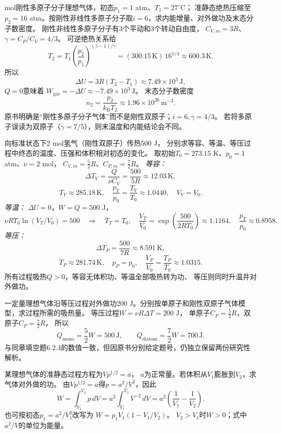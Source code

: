  mol刚性多原子分子理想气体，初态$p_1=1$ atm、$T_1=27^\circ\mathrm C$；
准静态绝热压缩至$p_2=16$ atm。按刚性非线性多原子分子取$i=6$，求内能增量、对外做功及末态分子数密度。
\workings
刚性非线性多原子分子有3个平动和3个转动自由度，
$C_{V,m}=3R$、$\gamma=C_P/C_V=4/3$。
可逆绝热关系给
\[
T_2=T_1\left(\frac{p_2}{p_1}\right)^{(\gamma-1)/\gamma}
=(300.15\,\mathrm K)\,16^{1/4}
\approx600.3\,\mathrm K.
\]
所以
\[
\boxed{\Delta U=3R(T_2-T_1)\approx7.49\times10^3\,\mathrm J},
\]
$Q=0$意味着
$\boxed{W_{\mathrm{gas}}=-\Delta U\approx-7.49\times10^3\,\mathrm J}$。
末态分子数密度
\[
\boxed{n_2=\frac{p_2}{k_{\mathrm B}T_2}
\approx1.96\times10^{26}\,\mathrm{m^{-3}}}.
\]
\crosscheck 原书明确是“刚性多原子分子气体”而不是刚性双原子；$i=6,\gamma=4/3$。
若将多原子误读为双原子（$\gamma=7/5$），则末温度和内能结论会不同。

\problemtext 向标准状态下2 mol氢气（刚性双原子）传热500 J，
分别求等容、等温、等压过程中终态的温度、压强和体积相对初态的变化。
\workings
取初始$T_0=273.15$ K、$p_0=1$ atm、$\nu=2$ mol，
$C_{V,m}=\frac52R$、$C_{P,m}=\frac72R$。
\emph{等容：}
\[
\Delta T_V=\frac{Q}{\nu C_V}=\frac{500}{5R}\approx12.03\,\mathrm K,
\]
\[
\boxed{T_V\approx285.18\,\mathrm K,\quad
\frac{p_V}{p_0}=\frac{T_V}{T_0}\approx1.0440,\quad
V_V=V_0}.
\]
\emph{等温：} $\Delta U=0$，$W=Q=500$ J，
\[
\nu RT_0\ln(V_T/V_0)=500
\quad\Longrightarrow\quad
\boxed{T_T=T_0,\quad
\frac{V_T}{V_0}=
\exp\left(\frac{500}{2RT_0}\right)\approx1.1164,
\quad\frac{p_T}{p_0}\approx0.8958}.
\]
\emph{等压：}
\[
\Delta T_P=\frac{500}{7R}\approx8.591\,\mathrm K,
\]
\[
\boxed{T_P\approx281.74\,\mathrm K,\quad
p_P=p_0,\quad
\frac{V_P}{V_0}=\frac{T_P}{T_0}\approx1.0315}.
\]
\crosscheck 所有过程吸热$Q>0$，等容无体积功、等温全部吸热转为功、
等压则同时升温并对外做功。

\problemtext 一定量理想气体沿等压过程对外做功200 J。分别按单原子和刚性双原子气体模型，求过程所需的吸热量。
\workings
等压过程$W=\nu R\Delta T=200$ J，
单原子$C_P=\frac52R$，双原子$C_P=\frac72R$，
所以
\[
\boxed{Q_{\mathrm{mono}}=\frac52W=500\,\mathrm J},\qquad
\boxed{Q_{\mathrm{diatom}}=\frac72W=700\,\mathrm J}.
\]
\crosscheck 与同章填空题6.2.4的数值一致，但因原书分别给定题号，仍独立保留两份研究性解析。

\problemtext 某理想气体的准静态过程方程为$Vp^{1/2}=a$，
$a$为正常量。若体积从$V_1$膨胀到$V_2$，求气体对外做的功。
\workings
由$Vp^{1/2}=a$得$p=a^2/V^2$，因此
\[
W=\int_{V_1}^{V_2}p\,dV
=a^2\int_{V_1}^{V_2}V^{-2}\,dV
=\boxed{a^2\left(\frac1{V_1}-\frac1{V_2}\right)}.
\]
也可按初态$p_1=a^2/V_1^2$改写为
$\boxed{W=p_1V_1(1-V_1/V_2)}$。
\crosscheck $V_2>V_1$时$W>0$；式中$a^2/V$的单位为能量。

